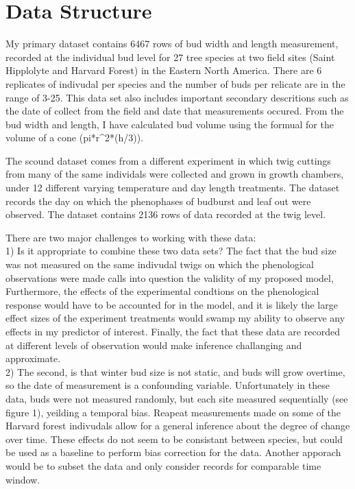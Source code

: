 \documentclass{article}\usepackage[]{graphicx}\usepackage[]{color}
\begin{document}
\section*{Data Structure}
My primary dataset contains 6467 rows of bud width and length measurement, recorded at the individual bud level for 27 tree species at two field sites (Saint Hipplolyte and Harvard Forest) in the Eastern North America. There are 6 replicates of indivudal per species and the number of buds per relicate are in the range of 3-25. This data set also includes important secondary descritions such as the date of collect from the field and date that measurements occured. From the bud width and length, I have calculated bud volume using the formual for the volume of a cone (pi*r^2*(h/3)).\par
The scound dataset comes from a different experiment in which twig cuttings from many of the same individals were collected and grown in growth chambers, under 12 different varying  temperature and day length treatments. The dataset records the day on which the phenophases of budburst and leaf out were observed. The dataset contains 2136 rows of data recorded at the twig level.\par
There are two major challenges to working with these data:\\
1) Is it appropriate to combine these two data sets? The fact that the bud size was not measured on the same indivudal twigs on which the phenological observations were made calls into question the validity of my proposed model, Furthermore, the effects of the experimental condtions on the phenological response would have to be accounted for in the model, and it is likely the large effect sizes of the experiment treatments would swamp my ability to observe any effects in my predictor of interest. Finally, the fact that these data are recorded at different levels of observation would make inference challanging and approximate.\\
2) The second, is that winter bud size is not static, and buds will grow overtime, so the date of measurement is a confounding variable. Unfortunately in these data, buds were not measured randomly, but each site measured sequentially (see figure 1), yeilding a temporal  bias. Reapeat measurements made on some of the Harvard forest indivudals allow for a general inference about the degree of change over time. These effects do not seem to be consistant between species, but could be used as a baseline to perform bias correction for the data. Another apporach would be to subset the data and only consider records for comparable time window.\\
\end{document}
